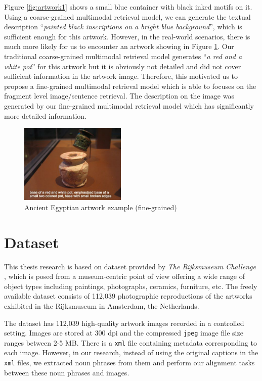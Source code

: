 Figure \ref{fig:artwork1} shows a small blue container with black inked motifs on it. Using a coarse-grained multimodal retrieval model, we can generate the textual description ``\textit{painted black inscriptions on a bright blue background}'', which is sufficient enough for this artwork. However, in the real-world scenarios, there is much more likely for us to encounter an artwork showing in Figure \ref{fig:artwork2}. Our traditional coarse-grained multimodal retrieval model generates ``\textit{a red and a white pot}'' for this artwork but it is obviously not detailed and did not cover sufficient information in the artwork image. Therefore, this motivated us to propose a fine-grained multimodal retrieval model which is able to focuses on the fragment level image/sentence retrieval. The description on the image was generated by our fine-grained multimodal retrieval model which has significantly more detailed information.

\begin{figure}[h!]
\centering
\includegraphics[width=0.45\textwidth]{artwork_fine2.pdf}
\caption{Ancient Egyptian artwork example (fine-grained)}
\label{fig:artwork2}
\end{figure}

\section{Dataset}

This thesis research is based on dataset provided by \textit{The Rijksmuseum Challenge} \cite{MensinkICMIR2014}, which is posed from a museum-centric point of view offering a wide range of object types including paintings, photographs, ceramics, furniture, etc. The freely available dataset consists of 112,039 photographic reproductions of the artworks exhibited in the Rijksmuseum in Amsterdam, the Netherlands. 

The dataset has 112,039 high-quality artwork images recorded
in a controlled setting. Images are stored at 300 dpi and the
compressed \verb|jpeg| image file size ranges between 2-5 MB. There is a \verb|xml| file containing metadata corresponding to each image. However, in our research, instead of using the original captions in the \verb|xml| files, we extracted noun phrases from them and perform our alignment tasks between these noun phrases and images.


